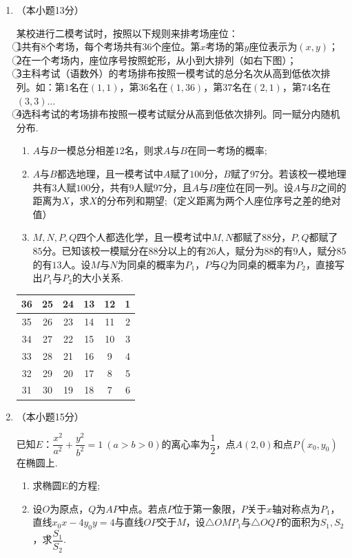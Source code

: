 \documentclass[11pt,a4paper]{ctexart}
\begin{document}
\begin{enumerate}[start=16]
    \item （本小题13分）
    
    某校进行二模考试时，按照以下规则来排考场座位：\\
    \textcircled {1}共有$8$个考场，每个考场共有$36$个座位。第$x$考场的第$y$座位表示为$(x,y)$；\\
    \textcircled {2}在一个考场内，座位序号按照蛇形，从小到大排列（如右下图）；\\
    \textcircled {3}主科考试（语数外）的考场排布按照一模考试的总分名次从高到低依次排列。如：第$1$名在$(1,1)$，第$36$名在$(1,36)$，第$37$名在$(2,1)$，第$74$名在$(3,3) \ldots$\\
    \textcircled {4}选科考试的考场排布按照一模考试赋分从高到低依次排列。同一赋分内随机分布.
    \begin{enumerate}[label=(\Roman*)]
        \item $A$与$B$一模总分相差$12$名，则求$A$与$B$在同一考场的概率;
        \item $A$与$B$都选地理，且一模考试中$A$赋了$100$分，$B$赋了$97$分。若该校一模地理共有$3$人赋$100$分，共有$9$人赋$97$分，且$A$与$B$座位在同一列。设$A$与$B$之间的距离为$X$，求$X$的分布列和期望;（定义距离为两个人座位序号之差的绝对值）
        \item $M,N,P,Q$四个人都选化学，且一模考试中$M,N$都赋了$88$分，$P,Q$都赋了$85$分。已知该校一模赋分在$88$分以上的有$26$人，赋分为$88$的有$9$人，赋分$85$的有$13$人。设$M$与$N$为同桌的概率为$P_1$，$P$与$Q$为同桌的概率为$P_2$，直接写出$P_1$与$P_2$的大小关系.\\
    \end{enumerate}

    \hfill
    \begin{tabular}{|c|c|c|c|c|c|}
        \hline
        36 & 25 & 24 & 13 & 12 & 1 \\
        \hline
        35 & 26 & 23 & 14 & 11 & 2 \\
        \hline
        34 & 27 & 22 & 15 & 10 & 3 \\
        \hline
        33 & 28 & 21 & 16 & 9 & 4 \\
        \hline
        32 & 29 & 20 & 17 & 8 & 5 \\
        \hline
        31 & 30 & 19 & 18 & 7 & 6 \\
        \hline
    \end{tabular}
    \newpage
    
    \item （本小题15分）
    
    已知$E$：$\dfrac{x^2}{a^2}+\dfrac{y^2}{b^2}=1\ (a>b>0)$的离心率为$\dfrac{1}{2}$，点$A(2,0)$和点$P(x_0,y_0)$在椭圆上.
    \begin{enumerate}[label=(\Roman*)]
        \item 求椭圆E的方程;
        \item 设$O$为原点，$Q$为$AP$中点。若点$P$位于第一象限，$P$关于$x$轴对称点为$P_1$，直线$x_0x-4y_0y=4$与直线$OP$交于$M$，设$\triangle OMP_1$与$\triangle OQP$的面积为$S_1,S_2$，求$\dfrac{S_1}{S_2}$.
    \end{enumerate}


\end{enumerate}
\end{document}
